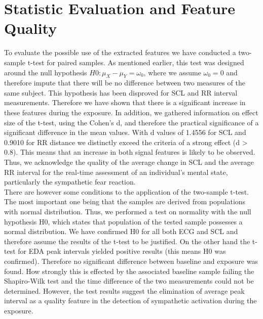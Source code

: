 \section{Statistic Evaluation and Feature Quality}

To evaluate the possible use of the extracted features we have conducted a two-sample t-test for paired samples. As mentioned earlier, this test was designed around the null hypothesis $H0: \mu_{X}-\mu_{Y} = \omega_{0}$, where we assume $\omega_{0}=0$ and therefore impute that there will be no difference between two measures of the same subject. This hypothesis has been disproved for SCL and RR interval measurements. Therefore we have shown that there is a significant increase in these features during the exposure. In addition, we gathered information on effect size of the t-test, using the Cohen's d, and therefore the practical significance of a significant difference in the mean values. With d values of 1.4556 for SCL and 0.9010 for RR distance we distinctly exceed the criteria of a strong effect (d > 0.8). This means that an increase in both signal features is likely to be observed. Thus, we acknowledge the quality of the average change in SCL and the average RR interval for the real-time assessment of an individual's mental state, particularly the sympathetic fear reaction.\\
There are however some conditions to the application of the two-sample t-test. The most important one being that the samples are derived from populations with normal distribution. Thus, we performed a test on normality with the null hypothesis H0, which states that population of the tested sample possesses a normal distribution. We have confirmed H0 for all both ECG and SCL and therefore assume the results of the t-test to be justified. On the other hand the t-test for EDA peak intervals yielded positive results (this means H0 was confirmed). Therefore no significant difference between baseline and exposure was found. How strongly this is effected by the associated baseline sample failing the Shapiro-Wilk test and the time difference of the two measurements could not be determined. However, the test results suggest the elimination of average peak interval as a quality feature in the detection of sympathetic activation during the exposure.  